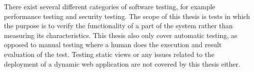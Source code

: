 There exist several different categories of software testing, for
example performance testing and security testing. The scope of this
thesis is tests in which the purpose is to verify the functionality of a
part of the system rather than measuring its characteristics. This
thesis also only cover automatic testing, as opposed to manual testing
where a human does the execution and result evaluation of the test.
Testing static views or any issues related to the deployment of a
dynamic web application are not covered by this thesis either.
